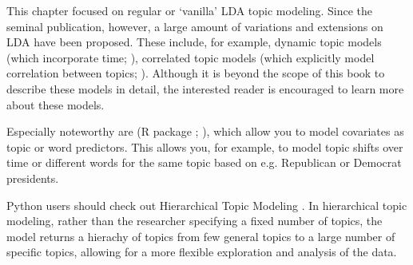 This chapter focused on regular or `vanilla' LDA topic modeling.
Since the seminal publication, however, a large amount of variations and extensions on LDA have been proposed.
These include, for example, dynamic topic models (which incorporate time; \cite*{dynamiclda}),
correlated topic models (which explicitly model correlation between topics; \cite{correlatedlda}).
Although it is beyond the scope of this book to describe these models in detail,
the interested reader is encouraged to learn more about these models.

Especially noteworthy are  (R package ; \cite*{stm}),
which allow you to model covariates as topic or word predictors.
This allows you, for example, to model topic shifts over time or
different words for the same topic based on e.g. Republican or Democrat presidents. 

Python users should check out Hierarchical Topic Modeling \citep{hierarchicallda}.
In hierarchical topic modeling, rather than the researcher specifying a fixed number of topics,
the model returns a hierachy of topics from few general topics to a large number of specific topics,
allowing for a more flexible exploration and analysis of the data. 


